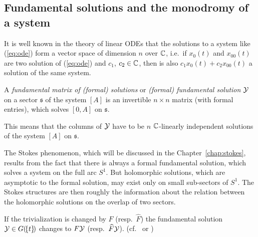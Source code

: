 \subsection{Fundamental solutions and the monodromy of a system}
It is well known in the theory of linear ODEs that the solutions to a system
like (\ref{eq:ode}) form a vector space of dimension $n$ over $\mathbb{C}$, i.e.\ if
$x_0(t)$ and $x_{00}(t)$ are two solution of (\ref{eq:ode}) and $c_1$,
$c_2\in\mathbb{C}$, then is also $c_1x_0(t)+c_2x_{00}(t)$ a solution of the same system.
\begin{defn}
  A \emph{fundamental matrix of (formal) solutions} or \emph{(formal)
  fundamental solution} $\mathcal{Y}$ on a sector $\mathfrak{s}$ of the
  system $[A]$ is an invertible $n\times n$ matrix (with formal entries), which
  solves $[0,A]$ on $\mathfrak{s}$.

  This means that the columns of $\mathcal{Y}$ have to be $n$ $\mathbb{C}$-linearly independent
  solutions of the system $[A]$ on $\mathfrak{s}$.
  \begin{comment}
    \begin{s-rem}
      \begin{itemize}
      \item Some authors\PROBLEM[?] introduce multi-valued solutions, to avoid
        the restriction to sectors.
        \begin{einr}
          \emph{Multi-valued} are functions, which are not single-valued and
          \emph{single-valued} is a function $f$, which satisfies
          \[
            f(t)=f(t\exp(2\pi i)) \qquad\text{whenever both sides are defined.}
          \]
        \end{einr}
        The function $t\to t^\alpha$, for example, is single-valued whenever
        $\alpha\in\Z$.
      \end{itemize}
    \end{s-rem}
  \end{comment}
\end{defn}
The Stokes phenomenon, which will be discussed in the
Chapter~\ref{chap:stokes}, results from the fact that there is always a formal
fundamental solution, which solves a system on the full arc $S^1$.
But holomorphic solutions, which are asymptotic to the formal solution, may
exist only on small sub-sectors of $S^1$. The Stokes structures are then
roughly the information about the relation between the holomorphic solutions on the overlap
of two sectors.
\begin{rem}\label{rem:fundChangeOnFund}
  If the trivialization is changed by $F$ (resp.\ $\hat F$) the fundamental
  solution $\mathcal{Y}\in G(\!\{t\}\!)$ changes to $F\mathcal{Y}$ (resp.\ $\widehat F\mathcal{Y}$).
  (cf.\ \cite[Thm.4.3.1]{Loday2014} or \cite[2.1.3]{Zein2009})
\end{rem}

